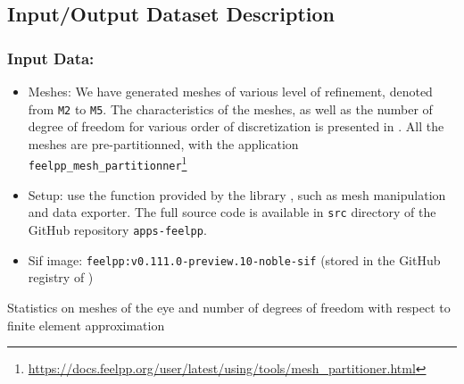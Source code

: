 \subsection{Input/Output Dataset Description}


\subsubsection{Input Data:}
  \begin{itemize}
    \item Meshes: We have generated meshes of various level of refinement, denoted from \texttt{M2} to \texttt{M5}.
      The characteristics of the meshes, as well as the number of degree of freedom for various order of discretization is presented in .
      All the meshes are pre-partitionned, with the application \texttt{feelpp\_mesh\_partitionner}\footnote{\url{https://docs.feelpp.org/user/latest/using/tools/mesh_partitioner.html}}
    \item Setup: use the function provided by the library \Feelpp, such as mesh manipulation and data exporter.
      The full source code is available in \texttt{src} directory of the GitHub repository \texttt{apps-feelpp}.
    \item Sif image: \texttt{feelpp:v0.111.0-preview.10-noble-sif}  (stored in the GitHub registry of \Feelpp)
  \end{itemize}

\begin{table}[!ht]
    \centering

  \caption{Statistics on meshes of the eye and number of degrees of freedom with respect to finite element approximation}
  \label{tab:spec:app-feelpp:eye2brain:mesh_stats}
\end{table}


